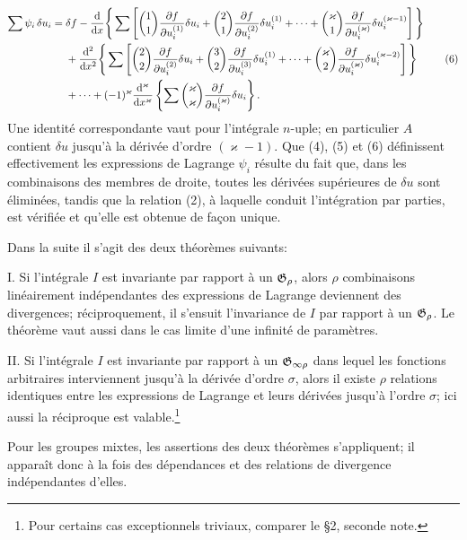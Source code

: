 \begin{equation}
\begin{aligned}
\sum\psi_i\,\delta u_i
={}&\delta f
-\frac{\mathrm d}{\mathrm d x}\Bigg\{\sum\left[
\binom{1}{1}\frac{\partial f}{\partial u_i^{(1)}}\delta u_i
+\binom{2}{1}\frac{\partial f}{\partial u_i^{(2)}}\delta u_i^{(1)}
+\cdots+
\binom{\varkappa}{1}\frac{\partial f}{\partial u_i^{(\varkappa)}}\delta u_i^{(\varkappa-1)}
\right]\Bigg\}\\
&+\frac{\mathrm d^2}{\mathrm d x^2}\Bigg\{\sum\left[
\binom{2}{2}\frac{\partial f}{\partial u_i^{(2)}}\delta u_i
+\binom{3}{2}\frac{\partial f}{\partial u_i^{(3)}}\delta u_i^{(1)}
+\cdots+
\binom{\varkappa}{2}\frac{\partial f}{\partial u_i^{(\varkappa)}}\delta u_i^{(\varkappa-2)}
\right]\Bigg\}\\
&+\cdots
+(-1)^\varkappa\frac{\mathrm d^\varkappa}{\mathrm d x^\varkappa}
\left\{\sum\binom{\varkappa}{\varkappa}
\frac{\partial f}{\partial u_i^{(\varkappa)}}\delta u_i\right\}.
\end{aligned}
\tag{6}
\end{equation}
Une identité correspondante vaut pour l'intégrale \(n\)-uple; en particulier \(A\) contient \(\delta u\) jusqu'à la dérivée d'ordre \((\varkappa-1)\). Que (4), (5) et (6) définissent effectivement les expressions de Lagrange \(\psi_i\) résulte du fait que, dans les combinaisons des membres de droite, toutes les dérivées supérieures de \(\delta u\) sont éliminées, tandis que la relation (2), à laquelle conduit l'intégration par parties, est vérifiée et qu'elle est obtenue de façon unique.

Dans la suite il s'agit des deux théorèmes suivants:

I. Si l'intégrale \(I\) est invariante par rapport à un \(\mathfrak G_\rho\), alors \(\rho\) combinaisons linéairement indépendantes des expressions de Lagrange deviennent des divergences; réciproquement, il s'ensuit l'invariance de \(I\) par rapport à un \(\mathfrak G_\rho\). Le théorème vaut aussi dans le cas limite d'une infinité de paramètres.

II. Si l'intégrale \(I\) est invariante par rapport à un \(\mathfrak G_{\infty\rho}\) dans lequel les fonctions arbitraires interviennent jusqu'à la dérivée d'ordre \(\sigma\), alors il existe \(\rho\) relations identiques entre les expressions de Lagrange et leurs dérivées jusqu'à l'ordre \(\sigma\); ici aussi la réciproque est valable.\footnote{Pour certains cas exceptionnels triviaux, comparer le \S{}2, seconde note.}

Pour les groupes mixtes, les assertions des deux théorèmes s'appliquent; il apparaît donc à la fois des dépendances et des relations de divergence indépendantes d'elles.

